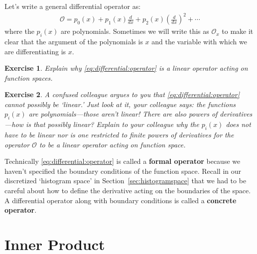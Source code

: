 \documentclass[
  11pt,
	colorful,
	raggedright,
]{tufte-style-thesis-flip}
\newtheorem{exercise}{Exercise}[section]
\begin{document}
Let's write a general differential operator as:
\begin{align}
  \mathcal O = 
  p_0(x) 
  + p_1(x) \frac{d}{dx}
  + p_2(x) \left(\frac{d}{dx}\right)^2
  + \cdots
  \label{eq:differential:operator}
\end{align}
where the $p_i(x)$ are polynomials. Sometimes we will write this as $\mathcal O_x$ to make it clear that the argument of the polynomials is $x$ and the variable with which we are differentiating is $x$.  
\begin{exercise}
Explain why \eqref{eq:differential:operator} is a linear operator acting on function spaces.
\end{exercise}
\begin{exercise}
A confused colleague argues to you that \eqref{eq:differential:operator} cannot possibly be `linear.' Just look at it, your colleague says: the functions $p_i(x)$ are polynomials---those aren't \emph{linear}! There are also powers of derivatives---how is that possibly linear? Explain to your colleague why the $p_i(x)$ does not have to be linear nor is one restricted to finite powers of derivatives for the operator $\mathcal O$ to be a linear operator acting on function space.
\end{exercise}
Technically \eqref{eq:differential:operator} is called a \textbf{formal operator} because we haven't specified the boundary conditions of the function space. Recall in our discretized `histogram space' in Section~\ref{sec:histogramspace} that we had to be careful about how to define the derivative acting on the boundaries of the space. A differential operator along with boundary conditions is called a \textbf{concrete operator}.

\section{Inner Product}
\end{document}

